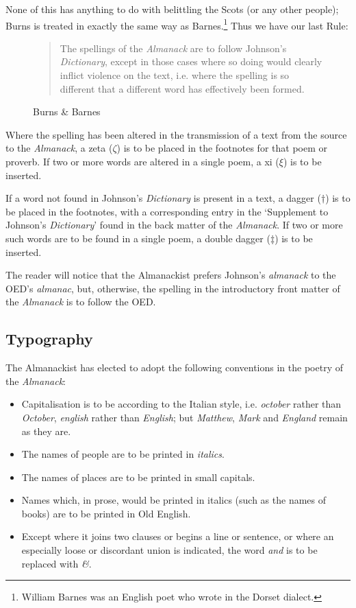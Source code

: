 \documentclass[0main.tex]{subfiles}
\begin{document}
None of this has anything to do with belittling the Scots (or any other people); Burns is treated in exactly the same way as Barnes.\footnote{William Barnes was an English poet who wrote in the Dorset dialect.} Thus we have our last Rule:

\begin{figure}[h]
\caption{Burns \& Barnes}
\begin{quote}
The spellings of the \emph{Almanack} are to follow Johnson's \emph{Dictionary}, except in those cases where so doing would clearly inflict violence on the text, i.e. where the spelling is so different that a different word has effectively been formed.
\end{quote}
\end{figure}

Where the spelling has been altered in the transmission of a text from the source to the \emph{Almanack}, a zeta ($\zeta$) is to be placed in the footnotes for that poem or proverb. If two or more words are altered in a single poem, a xi ($\xi$) is to be inserted.

If a word not found in Johnson's \emph{Dictionary} is present in a text, a dagger ($\dagger$) is to be placed in the footnotes, with a corresponding entry in the `Supplement to Johnson's \emph{Dictionary}' found in the back matter of the \emph{Almanack}. If two or more such words are to be found in a single poem, a double dagger ($\ddagger$) is to be inserted.

The reader will notice that the Almanackist prefers Johnson's \emph{almanack} to the OED's \emph{almanac}, but, otherwise, the spelling in the introductory front matter of the \emph{Almanack} is to follow the OED.

\subsection{Typography}

The Almanackist has elected to adopt the following conventions in the poetry of the \emph{Almanack}:

\begin{itemize}
\item{Capitalisation is to be according to the Italian style, i.e. \emph{october} rather than \emph{October}, \emph{english} rather than \emph{English}; but \emph{Matthew}, \emph{Mark} and \emph{England} remain as they are.}
\item{The names of people are to be printed in \emph{italics}.}
\item{The names of places are to be printed in {\sc small capitals}.}
\item{Names which, in prose, would be printed in italics (such as the names of books) are to be printed in {\hge Old English}.}
\item{Except where it joins two clauses or begins a line or sentence, or where an especially loose or discordant union is indicated, the word \emph{and} is to be replaced with \emph{\&}.}
\end{itemize}
\end{document}
